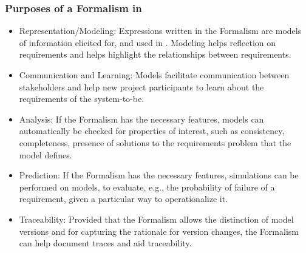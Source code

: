 \documentclass[10pt, final, conference, compsocconf]{IEEEtran}
\begin{document}
\subsubsection{Purposes of a Formalism in }
\begin{itemize}
\item{Representation/Modeling: Expressions written in the Formalism are models of information elicited for, and used in . Modeling helps reflection on requirements and helps highlight the relationships between requirements.}
\item{Communication and Learning: Models facilitate communication between stakeholders and help new project participants to learn about the requirements of the system-to-be.}
\item{Analysis: If the Formalism has the necessary features, models can automatically be checked for properties of interest, such as consistency, completeness, presence of solutions to the requirements problem that the model defines.}
\item{Prediction: If the Formalism has the necessary features, simulations can be performed on models, to evaluate, e.g., the probability of failure of a requirement, given a particular way to operationalize it.}
\item{Traceability: Provided that the Formalism allows the distinction of model versions and for capturing the rationale for version changes, the Formalism can help document traces and aid traceability.}
\end{itemize}

\end{document}
